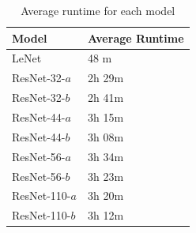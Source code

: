     

\begin{table}[t]
    \setlength{\abovecaptionskip}{5pt}
    \caption{Average runtime for each model}
    \centering
  
    \begin{tabular}{l||l}
    \hline
    \textbf{Model} & \textbf{Average Runtime} \\
    \hline
    LeNet & 48 m \\
    ResNet-32-$a$ & 2h 29m \\
    ResNet-32-$b$ & 2h 41m \\
    ResNet-44-$a$ & 3h 15m \\
    ResNet-44-$b$ & 3h 08m \\
    ResNet-56-$a$ & 3h 34m \\
    ResNet-56-$b$ & 3h 23m \\
    ResNet-110-$a$ & 3h 20m \\
    ResNet-110-$b$ & 3h 12m \\
    \end{tabular}
    
    \label{runtime-table}
\end{table}

